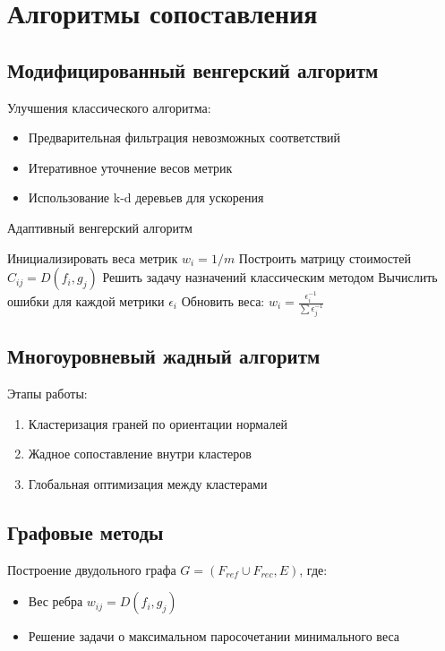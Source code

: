\documentclass[a4paper,12pt]{article}
\begin{document}
\section{Алгоритмы сопоставления}
\subsection{Модифицированный венгерский алгоритм}
Улучшения классического алгоритма:
\begin{itemize}
    \item Предварительная фильтрация невозможных соответствий
    \item Итеративное уточнение весов метрик
    \item Использование k-d деревьев для ускорения
\end{itemize}

\begin{algorithm}[H]
\caption{Адаптивный венгерский алгоритм}\label{hungarian_adaptive}
\begin{algorithmic}[1]
\State Инициализировать веса метрик $w_i = 1/m$
    \State Построить матрицу стоимостей $C_{ij} = D(f_i, g_j)$
    \State Решить задачу назначений классическим методом
    \State Вычислить ошибки для каждой метрики $\epsilon_i$
    \State Обновить веса: $w_i = \frac{\epsilon_i^{-1}}{\sum \epsilon_j^{-1}}$
\EndWhile
\end{algorithmic}
\end{algorithm}

\subsection{Многоуровневый жадный алгоритм}
Этапы работы:
\begin{enumerate}
    \item Кластеризация граней по ориентации нормалей
    \item Жадное сопоставление внутри кластеров
    \item Глобальная оптимизация между кластерами
\end{enumerate}

\subsection{Графовые методы}
Построение двудольного графа $G=(F_{ref} \cup F_{rec}, E)$, где:
\begin{itemize}
    \item Вес ребра $w_{ij} = D(f_i, g_j)$
    \item Решение задачи о максимальном паросочетании минимального веса
\end{itemize}
\end{document}
